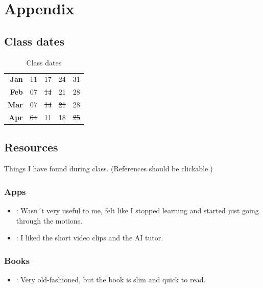 \chapter{Appendix}

\section*{Class dates}
\begin{table}[ht]
	\centering
	\begin{tabular}{r c c c c }
		\textbf{Jan} & \sout{11} & 17        & 24        & 31  \\
		\textbf{Feb} & 07        & \sout{14} & 21        & 28  \\
		\textbf{Mar} & 07        & \sout{14} & \sout{21} & 28  \\
		\textbf{Apr} & \sout{04} & 11        & 18        & \sout{25}             
	\end{tabular}
	\caption{Class dates}
	\label{tab:tClassDates}
\end{table}

\section*{Resources}
Things I have found during class. (References should be clickable.)

\subsection*{Apps}
    \begin{itemize}
        \item \cite{Duolingo}: Wasn´t very useful to me, felt like I stopped learning and started just going through the motions.
        \item \cite{Memrise}: I liked the short video clips and the AI tutor.        
    \end{itemize}  

\subsection*{Books}
    \begin{itemize}
        \item \cite{Ragusa}: Very old-fashioned, but the book is slim and quick to read.
    \end{itemize}  


